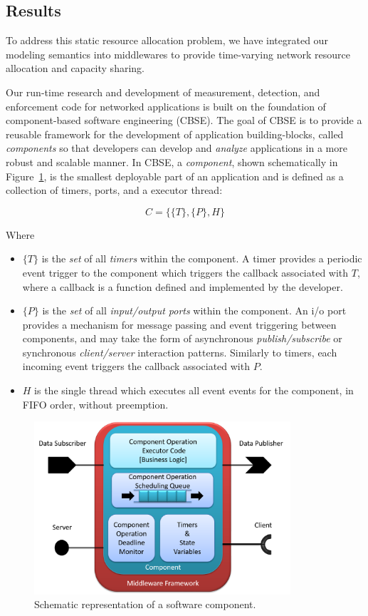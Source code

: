 \subsection{Results}
To address this static resource allocation problem, we have integrated
our modeling semantics into middlewares to provide time-varying
network resource allocation and capacity sharing.

Our run-time research and development of measurement, detection, and
enforcement code for networked applications is built on the foundation
of component-based software engineering (CBSE).  The goal of CBSE is
to provide a reusable framework for the development of application
building-blocks, called \emph{components} so that developers can develop
and \emph{analyze} applications in a more robust and scalable manner.  In
CBSE, a \emph{component}, shown schematically in
Figure~\ref{fig:component}, is the smallest deployable part of an
application and is defined as a collection of timers, ports, and a
executor thread:

\begin{equation}
  C = \{\{T\},\{P\},H\}
\end{equation}

Where

\begin{itemize}
\item $\{T\}$ is the \emph{set} of all \emph{timers} within the component.  A
  timer provides a periodic event trigger to the component which
  triggers the callback associated with $T$, where a callback is a
  function defined and implemented by the developer.  
\item $\{P\}$ is the \emph{set} of all \emph{input/output ports} within the
  component.  An i/o port provides a mechanism for message passing and
  event triggering between components, and may take the form of
  asynchronous \emph{publish/subscribe} or synchronous \emph{client/server}
  interaction patterns.  Similarly to timers, each incoming event
  triggers the callback associated with $P$.
\item $H$ is the single thread which executes all event events for
  the component, in FIFO order, without preemption.  
\end{itemize}

\begin{figure}[ht!]
  \centering
  \includegraphics[width=0.85\textwidth]{figs/ros_component.png}
  \caption{Schematic representation of a software component.}
  \label{fig:component}
\end{figure}

